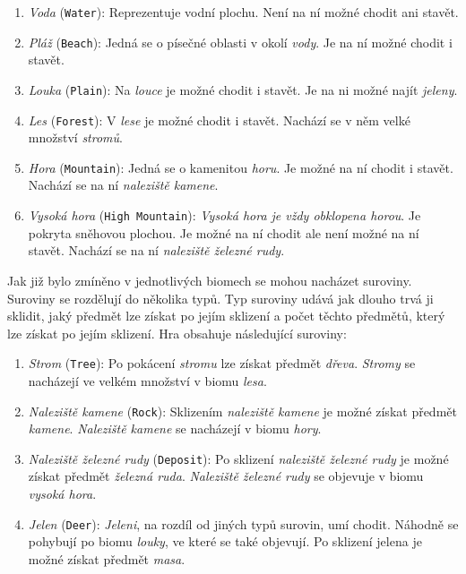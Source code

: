 \begin{enumerate}
    \item \textit{Voda} (\verb|Water|): Reprezentuje vodní plochu. Není na ní možné chodit ani stavět.
    \item \textit{Pláž} (\verb|Beach|): Jedná se o písečné oblasti v okolí \textit{vody}. Je na ní možné chodit i stavět.
    \item \textit{Louka} (\verb|Plain|): Na \textit{louce} je možné chodit i stavět. Je na ni možné najít \textit{jeleny}.
    \item \textit{Les} (\verb|Forest|): V \textit{lese} je možné chodit i stavět. Nachází se v něm velké množství \textit{stromů}.
    \item \textit{Hora} (\verb|Mountain|): Jedná se o kamenitou \textit{horu}. Je možné na ní chodit i stavět. Nachází se na ní \textit{naleziště kamene}.
    \item \textit{Vysoká hora} (\verb|High Mountain|): \textit{Vysoká hora je vždy obklopena \textit{horou}}. Je pokryta sněhovou plochou. Je možné na ní chodit ale není možné na ní stavět. Nachází se na ní \textit{naleziště železné rudy}.
\end{enumerate}

Jak již bylo zmíněno v jednotlivých biomech se mohou nacházet suroviny. Suroviny se rozdělují do několika typů. Typ suroviny udává jak dlouho trvá ji sklidit, jaký předmět lze získat po jejím sklizení a počet těchto předmětů, který lze získat po jejím sklizení. Hra obsahuje následující suroviny:

\begin{enumerate}
    \item \textit{Strom} (\verb|Tree|): Po pokácení \textit{stromu} lze získat předmět \textit{dřeva}. \textit{Stromy} se nacházejí ve velkém množství v biomu \textit{lesa}.
    \item \textit{Naleziště kamene} (\verb|Rock|): Sklizením \textit{naleziště kamene} je možné získat předmět \textit{kamene}. \textit{Naleziště kamene} se nacházejí v biomu \textit{hory}.
    \item \textit{Naleziště železné rudy} (\verb|Deposit|): Po sklizení \textit{naleziště železné rudy} je možné získat předmět \textit{železná ruda}. \textit{Naleziště železné rudy} se objevuje v biomu \textit{vysoká hora}.
    \item \textit{Jelen} (\verb|Deer|): \textit{Jeleni}, na rozdíl od jiných typů surovin, umí chodit. Náhodně se pohybují po biomu \textit{louky}, ve které se také objevují. Po sklizení jelena je možné získat předmět \textit{masa}.
\end{enumerate}

